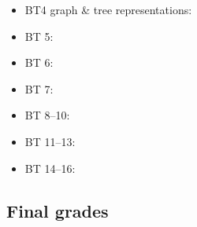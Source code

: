 \documentclass{article}
\begin{document}
\begin{enumerate}
\begin{itemize}
\begin{itemize}
            \item BT4 graph \& tree representations:
            \item BT 5:
            \item BT 6:
            \item BT 7:
            \item BT 8--10:
            \item BT 11--13:
            \item BT 14--16:
        \end{itemize}
    \end{itemize}
\end{enumerate}


\subsection{Final grades}
\end{document}
